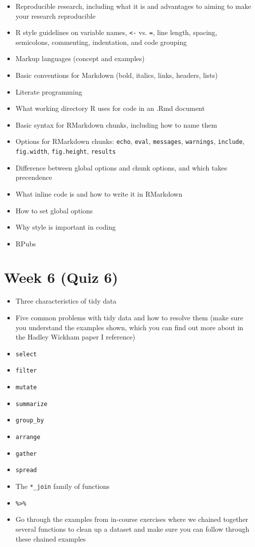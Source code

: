 \documentclass[]{book}
\providecommand{\tightlist}{%
  \setlength{\itemsep}{0pt}\setlength{\parskip}{0pt}}
\begin{document}
\begin{itemize}
\tightlist
\item
  Reproducible research, including what it is and advantages to aiming
  to make your research reproducible
\item
  R style guidelines on variable names, \texttt{\textless{}-} vs.
  \texttt{=}, line length, spacing, semicolons, commenting, indentation,
  and code grouping
\item
  Markup languages (concept and examples)
\item
  Basic conventions for Markdown (bold, italics, links, headers, lists)
\item
  Literate programming
\item
  What working directory R uses for code in an .Rmd document
\item
  Basic syntax for RMarkdown chunks, including how to name them
\item
  Options for RMarkdown chunks: \texttt{echo}, \texttt{eval},
  \texttt{messages}, \texttt{warnings}, \texttt{include},
  \texttt{fig.width}, \texttt{fig.height}, \texttt{results}
\item
  Difference between global options and chunk options, and which takes
  precendence
\item
  What inline code is and how to write it in RMarkdown
\item
  How to set global options
\item
  Why style is important in coding
\item
  RPubs
\end{itemize}

\section{Week 6 (Quiz 6)}\label{week-6-quiz-6}

\begin{itemize}
\tightlist
\item
  Three characteristics of tidy data
\item
  Five common problems with tidy data and how to resolve them (make sure
  you understand the examples shown, which you can find out more about
  in the Hadley Wickham paper I reference)
\item
  \texttt{select}
\item
  \texttt{filter}
\item
  \texttt{mutate}
\item
  \texttt{summarize}
\item
  \texttt{group\_by}
\item
  \texttt{arrange}
\item
  \texttt{gather}
\item
  \texttt{spread}
\item
  The \texttt{*\_join} family of functions
\item
  \texttt{\%\textgreater{}\%}
\item
  Go through the examples from in-course exercises where we chained
  together several functions to clean up a dataset and make sure you can
  follow through these chained examples
\end{itemize}
\end{document}
